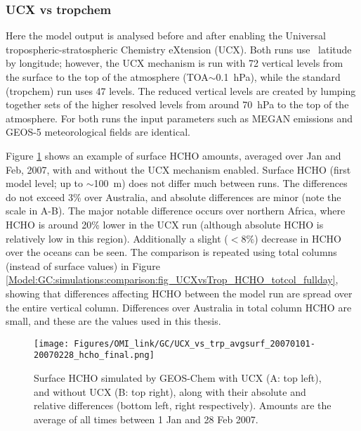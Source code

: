     \subsubsection{UCX vs tropchem}
      \label{Model:GC:simulations:comparison}
      
      Here the model output is analysed before and after enabling the Universal tropospheric-stratospheric Chemistry eXtension (UCX).
      Both runs use \lowhr ~latitude by longitude; however, the UCX mechanism is run with 72 vertical levels from the surface to the top of the atmosphere (TOA$\sim$0.1~hPa), while the standard (tropchem) run uses 47 levels.
      The reduced vertical levels are created by lumping together sets of the higher resolved levels from around 70~hPa to the top of the atmosphere.
      For both runs the input parameters such as MEGAN emissions and GEOS-5 meteorological fields are identical.
      
      Figure \ref{Model:GC:simulations:comparison:fig_UCXvsTrop_HCHO_surf_fullday} shows an example of surface HCHO amounts, averaged over Jan and Feb, 2007, with and without the UCX mechanism enabled.
      Surface HCHO (first model level; up to $\sim$100~m) does not differ much between runs.
      The differences do not exceed 3\% over Australia, and absolute differences are minor (note the scale in A-B).
      The major notable difference occurs over northern Africa, where HCHO is around 20\% lower in the UCX run (although absolute HCHO is relatively low in this region).
      Additionally a slight ($<8\%$) decrease in HCHO over the oceans can be seen.
      The comparison is repeated using total columns (instead of surface values) in Figure \ref{Model:GC:simulations:comparison:fig_UCXvsTrop_HCHO_totcol_fullday}, showing that differences affecting HCHO between the model run are spread over the entire vertical column.
      Differences over Australia in total column HCHO are small, and these are the values used in this thesis.
      
      \begin{figure}
        \texttt{[image: Figures/OMI\_link/GC/UCX\_vs\_trp\_avgsurf\_20070101-20070228\_hcho\_final.png]}
        \caption{%
          Surface HCHO simulated by GEOS-Chem with UCX (A: top left), and without UCX (B: top right), along with their absolute and relative differences (bottom left, right respectively).
          Amounts are the average of all times between 1 Jan and 28 Feb 2007.
        }
        \label{Model:GC:simulations:comparison:fig_UCXvsTrop_HCHO_surf_fullday}
      \end{figure}
      
